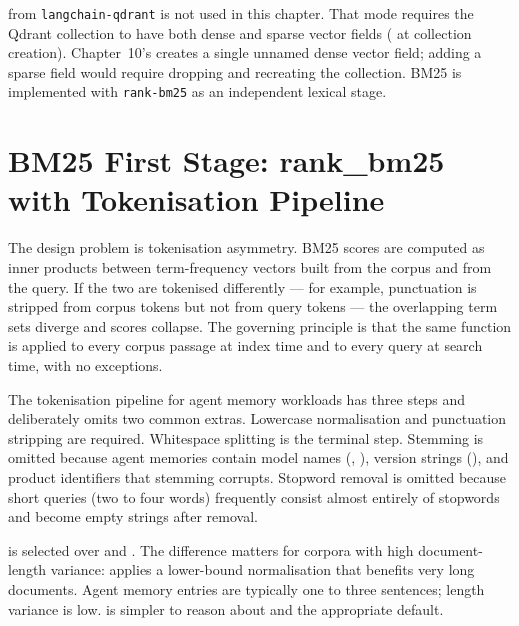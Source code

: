 \begin{warningbox}
 from \texttt{langchain-qdrant} is not used in
this chapter. That mode requires the Qdrant collection to have both dense
and sparse vector fields ( at collection
creation). Chapter~10's  creates
a single unnamed dense vector field; adding a sparse field would require
dropping and recreating the collection. BM25 is implemented with
\texttt{rank-bm25} as an independent lexical stage.
\end{warningbox}


\section{BM25 First Stage: rank\_bm25 with Tokenisation Pipeline}
\label{sec:bm25-stage}

The design problem is tokenisation asymmetry. BM25 scores are computed as
inner products between term-frequency vectors built from the corpus and from
the query. If the two are tokenised differently --- for example, punctuation is
stripped from corpus tokens but not from query tokens --- the overlapping term
sets diverge and scores collapse. The governing principle is that the same
 function is applied to every corpus passage at index time
and to every query at search time, with no exceptions.

The tokenisation pipeline for agent memory workloads has three steps and
deliberately omits two common extras. Lowercase normalisation and punctuation
stripping are required. Whitespace splitting is the terminal step. Stemming
is omitted because agent memories contain model names (,
), version strings (), and product
identifiers that stemming corrupts. Stopword removal is omitted because short
queries (two to four words) frequently consist almost entirely of stopwords
and become empty strings after removal.

 is selected over  and . The
difference matters for corpora with high document-length variance: 
applies a lower-bound normalisation that benefits very long documents.
Agent memory entries are typically one to three sentences; length variance is
low.  is simpler to reason about and the appropriate default.

